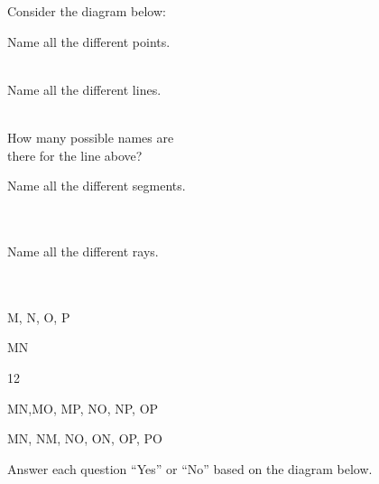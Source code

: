 \begin{exercises}
	\begin{ex}
	\e Consider the diagram below:\\
	\begin{center}
	\end{center}
	\begin{exparts} 
	\begin{multicols}{2}
	\item Name all the different points.\\\\
	\item Name all the different lines.\\\\
	\item How many possible names are\\ there for the line above?\\
	\item Name all the different segments.\\\\\\
	\item Name all the different rays.\\\\\\
	\end{multicols}
	\end{exparts}
	
	\begin{sol}
		\hspace*{\fill}
		\begin{exparts}
		\item \pnt M, \pnt N, \pnt O, \pnt P
		\item \lin MN
		\item 12
		\item \seg MN,\seg MO, \seg MP, \seg NO, \seg NP, \seg OP
		\item \ray MN, \ray NM, \ray NO, \ray ON, \ray OP, \ray PO
		\end{exparts}
	\end{sol}
	\end{ex}
	
		
	\begin{ex}
	\e Answer each question ``Yes'' or ``No'' based on the diagram below.


\end{ex}
\end{exercises}
